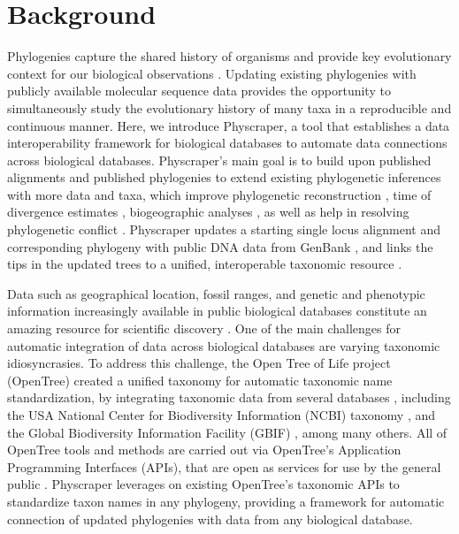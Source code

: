 \documentclass{bmcart}
\begin{document}

\section*{Background}
Phylogenies capture the shared history of organisms and provide key evolutionary
context for our biological observations \cite{dobzhansky1973nothing}.
Updating existing phylogenies with publicly available molecular sequence data provides
the opportunity to simultaneously study
the evolutionary history of many taxa in a reproducible and continuous manner.
Here, we introduce Physcraper, a tool that establishes a data interoperability
framework for biological databases to automate data connections across biological databases.
Physcraper's main goal is to build upon published alignments and published phylogenies
to extend existing phylogenetic inferences with more data and taxa, which improve
phylogenetic reconstruction \cite{hillis1996inferring, natsidis2019phylogenomics},
time of divergence estimates \cite{schulte2013undersampling, soares2015influence},
biogeographic analyses \cite{kayaalp2017back},
as well as help in resolving phylogenetic conflict \cite{hedtke2006resolution, townsend2010optimal, natsidis2019phylogenomics}.
Physcraper updates a starting single locus alignment and corresponding phylogeny
with public DNA data from GenBank \cite{benson2000genbank}, and links the tips in the updated trees to a unified, interoperable
taxonomic resource \cite{rees2017automated}.

Data such as
geographical location, fossil ranges, and genetic and phenotypic information increasingly
available in public biological databases constitute an amazing
resource for scientific discovery \cite{baxevanis2015importance}.
One of the main challenges for automatic
integration of data across biological databases are varying taxonomic idiosyncrasies.
To address this challenge, the Open Tree of Life project (OpenTree)
created a unified taxonomy for automatic taxonomic name standardization, by integrating taxonomic
data from several databases \cite{rees2017automated}, including the USA National
Center for Biodiversity Information (NCBI) taxonomy \cite{federhen_ncbi_2012, schoch_ncbi_2020},
and the Global Biodiversity Information Facility (GBIF) \cite{gbif_secretariat_gbif_2019}, among many others.
All of OpenTree tools and methods are carried out via OpenTree's Application Programming Interfaces (APIs),
that are open as services for use by the general public \cite{opentreeAPIs}.
Physcraper leverages on existing OpenTree's taxonomic APIs to
standardize taxon names in any phylogeny, providing
a framework for automatic connection of updated phylogenies with data from any biological database.
\end{document}
